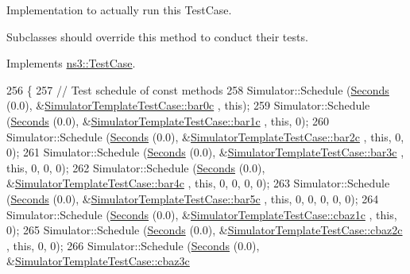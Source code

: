 Implementation to actually run this Test\+Case. 

Subclasses should override this method to conduct their tests. 

Implements \hyperlink{classns3_1_1TestCase_a8ff74680cf017ed42011e4be51917a24}{ns3\+::\+Test\+Case}.


\begin{DoxyCode}
256 \{
257   \textcolor{comment}{// Test schedule of const methods}
258   Simulator::Schedule (\hyperlink{group__timecivil_ga33c34b816f8ff6628e33d5c8e9713b9e}{Seconds} (0.0), &\hyperlink{classSimulatorTemplateTestCase_a39381dd6c298ce90120f9ca020b51a44}{SimulatorTemplateTestCase::bar0c}
      , \textcolor{keyword}{this});
259   Simulator::Schedule (\hyperlink{group__timecivil_ga33c34b816f8ff6628e33d5c8e9713b9e}{Seconds} (0.0), &\hyperlink{classSimulatorTemplateTestCase_a17a705290d33ff9d9752c5fcd3ca549a}{SimulatorTemplateTestCase::bar1c}
      , \textcolor{keyword}{this}, 0);
260   Simulator::Schedule (\hyperlink{group__timecivil_ga33c34b816f8ff6628e33d5c8e9713b9e}{Seconds} (0.0), &\hyperlink{classSimulatorTemplateTestCase_a95e0f184170b9dd6ced11d3423752e9f}{SimulatorTemplateTestCase::bar2c}
      , \textcolor{keyword}{this}, 0, 0);
261   Simulator::Schedule (\hyperlink{group__timecivil_ga33c34b816f8ff6628e33d5c8e9713b9e}{Seconds} (0.0), &\hyperlink{classSimulatorTemplateTestCase_a3440409096aee7c6dda41caab7cceeb6}{SimulatorTemplateTestCase::bar3c}
      , \textcolor{keyword}{this}, 0, 0, 0);
262   Simulator::Schedule (\hyperlink{group__timecivil_ga33c34b816f8ff6628e33d5c8e9713b9e}{Seconds} (0.0), &\hyperlink{classSimulatorTemplateTestCase_a4d7fde0e0f8f16201cb8731a65c84188}{SimulatorTemplateTestCase::bar4c}
      , \textcolor{keyword}{this}, 0, 0, 0, 0);
263   Simulator::Schedule (\hyperlink{group__timecivil_ga33c34b816f8ff6628e33d5c8e9713b9e}{Seconds} (0.0), &\hyperlink{classSimulatorTemplateTestCase_af3908d1e88e554a76b7fcb7c6011182a}{SimulatorTemplateTestCase::bar5c}
      , \textcolor{keyword}{this}, 0, 0, 0, 0, 0);
264   Simulator::Schedule (\hyperlink{group__timecivil_ga33c34b816f8ff6628e33d5c8e9713b9e}{Seconds} (0.0), &\hyperlink{classSimulatorTemplateTestCase_abfb9fdb2a45df1b572e31d911da70af1}{SimulatorTemplateTestCase::cbaz1c}
      , \textcolor{keyword}{this}, 0);
265   Simulator::Schedule (\hyperlink{group__timecivil_ga33c34b816f8ff6628e33d5c8e9713b9e}{Seconds} (0.0), &\hyperlink{classSimulatorTemplateTestCase_aceaaaedcf5defc916793b2b5d0908cae}{SimulatorTemplateTestCase::cbaz2c}
      , \textcolor{keyword}{this}, 0, 0);
266   Simulator::Schedule (\hyperlink{group__timecivil_ga33c34b816f8ff6628e33d5c8e9713b9e}{Seconds} (0.0), &\hyperlink{classSimulatorTemplateTestCase_a231add1c9938940ecfde69823e44dfc4}{SimulatorTemplateTestCase::cbaz3c}

\end{DoxyCode}
